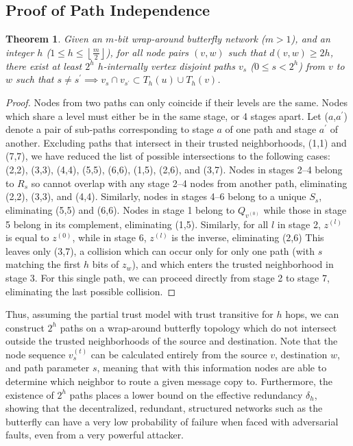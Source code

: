 \documentclass[10pt,letterpaper]{article}
\newtheorem{theorem}{Theorem}
\begin{document}
\subsection*{Proof of Path Independence}

\begin{theorem}
Given an $m$-bit wrap-around butterfly network ($m > 1$),
and an integer $h$ ($1 \leq h \leq \left\lfloor \frac{m}{2} \right\rfloor$),
for all node pairs $(v, w)$ such that $d(v,w) \geq 2h$,
there exist at least $2^h$ $h$-internally vertex disjoint
paths $v_s$ ($0 \le s < 2^h$) from
$v$ to $w$ such that
$s \neq s^\prime \implies v_s \cap v_{s^\prime} \subset T_h(u) \cup T_h(v)$.
\end{theorem}
\begin{proof}
Nodes from two paths can only coincide if their levels are the same.
Nodes which share a level must either be in the same stage, or 4 stages
apart.
Let ($a$,$a^\prime$) denote a pair of sub-paths corresponding to stage $a$ of
one path and stage $a^\prime$ of another.
Excluding paths that intersect in their trusted neighborhoods, (1,1) and (7,7),
we have reduced the list of possible intersections to the following cases:
(2,2), (3,3), (4,4), (5,5), (6,6), (1,5), (2,6), and (3,7).
Nodes in stages 2--4 belong to $R_s$ so cannot overlap with any stage 2--4
nodes from another path, eliminating (2,2), (3,3), and (4,4).
Similarly, nodes in stages 4--6 belong to a unique $S_s$,
eliminating (5,5) and (6,6).
Nodes in stage 1 belong to $Q_{v^{(0)}}$ while those in stage 5 belong in
its complement, eliminating (1,5).
Similarly, for all $l$ in stage 2, $z^{(l)}$ is equal to $z^{(0)}$,
while in stage 6, $z^{(l)}$ is the inverse, eliminating (2,6)
This leaves only (3,7), a collision which can occur only for only one path
(with $s$ matching the first $h$ bits of $z_w$), and which enters the trusted
neighborhood in stage 3.
For this single path, we can proceed directly from stage 2 to stage 7,
eliminating the last possible collision.
\end{proof}

Thus, assuming the partial trust model with trust transitive
for $h$ hops, we can construct $2^h$ paths on a wrap-around butterfly topology
which do not intersect outside the trusted neighborhoods of the source and
destination.
Note that the node sequence $v_s^{(t)}$ can be calculated entirely
from the source $v$, destination $w$, and path parameter $s$,
meaning that with this information nodes are able to determine which neighbor
to route a given message copy to.
Furthermore, the existence of $2^h$ paths places a lower bound on the
effective redundancy $\delta_h$,
showing that the decentralized, redundant, structured networks such as the
butterfly can have a very low probability of failure when faced with
adversarial faults, even from a very powerful attacker.
\end{document}
